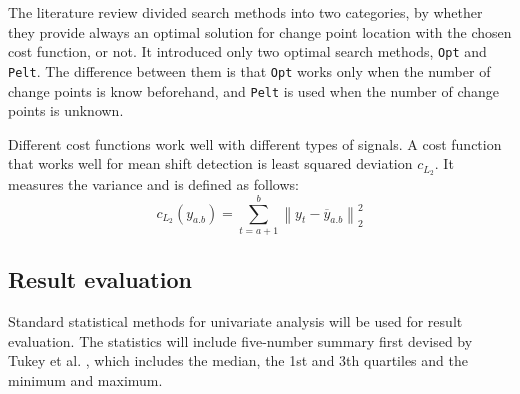 The literature review divided search methods into two categories, by whether they provide always an optimal solution for change point location with the chosen cost function, or not. It introduced only two optimal search methods, \texttt{Opt} and \texttt{Pelt}. The difference between them is that \texttt{Opt} works only when the number of change points is know beforehand, and \texttt{Pelt} is used when the number of change points is unknown. 

Different cost functions work well with different types of signals. 
A cost function that works well for mean shift detection is least squared deviation $c_{L_2}$. It measures the variance and is defined as follows:
\begin{equation}
    c_{L_2}(y_{a.b}) = \sum^b_{t=a+1} \left\lVert y_t-\overline{y}_{a.b} \right\rVert ^2_2%
    \label{eq:l2}
\end{equation}


\subsection{Result evaluation} \label{subsec:validation} %


Standard statistical methods for univariate analysis will be used for result evaluation. The statistics will include five-number summary first devised by Tukey et al. \cite{tukeyExploratoryDataAnalysis1977a}, which includes the median, the 1st and 3th quartiles and the minimum and maximum.



